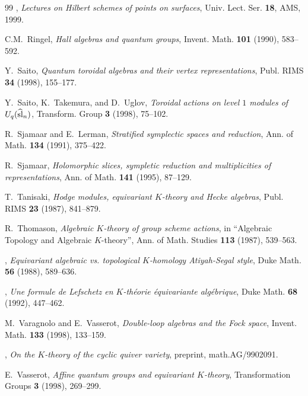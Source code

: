 \documentclass[12pt]{amsart}
\theoremstyle{definition}
\theoremstyle{remark}
\numberwithin{equation}{subsection}
\begin{document}
\begin{thebibliography}{99}
 \bysame,
{\it Lectures on Hilbert schemes of points on surfaces},
Univ. Lect. Ser. {\bf 18}, AMS, 1999.

  C.M.~Ringel,
{\it Hall algebras and quantum groups},
Invent. Math. {\bf 101} (1990), 583--592.

 Y.~Saito,
{\it Quantum toroidal algebras and their vertex representations},
Publ. RIMS {\bf 34} (1998), 155--177.

 Y.~Saito, K.~Takemura, and D.~Uglov,
{\it Toroidal actions on level $1$ modules of $U\sb q(\widehat{\rm
sl}\sb n)$},
Transform. Group {\bf 3} (1998), 75--102.

 R.~Sjamaar and E.~Lerman,
{\it Stratified symplectic spaces and reduction},
 Ann. of Math. {\bf 134} (1991), 375--422.

 R.~Sjamaar,
{\it Holomorphic slices, sympletic reduction and multiplicities of
representations},
Ann. of Math. {\bf 141} (1995), 87--129.

 T.~Tanisaki,
{\it Hodge modules, equivariant $K$-theory and Hecke algebras},
Publ. RIMS {\bf 23} (1987), 841--879.

 R.~Thomason,
{\it Algebraic $K$-theory of group scheme actions},
in ``Algebraic Topology and Algebraic $K$-theory'',
Ann. of Math. Studies {\bf 113} (1987), 539--563.

 \bysame,
{\it Equivariant algebraic vs. topological $K$-homology Atiyah-Segal
style},
Duke Math. {\bf 56} (1988), 589--636.

 \bysame,
{\it Une formule de Lefschetz en $K$-th\'eorie \'equivariante
alg\'ebrique},
Duke Math. {\bf 68} (1992), 447--462.

 M.~Varagnolo and E.~Vasserot,
{\it Double-loop algebras and the Fock space},
Invent. Math. {\bf 133} (1998), 133--159.

 \bysame,
{\it On the $K$-theory of the cyclic quiver variety},
preprint, math.AG/9902091.

 E.~Vasserot,
{\it Affine quantum groups and equivariant $K$-theory},
Transformation Groups {\bf 3} (1998), 269--299.

\end{thebibliography}
\end{document}
